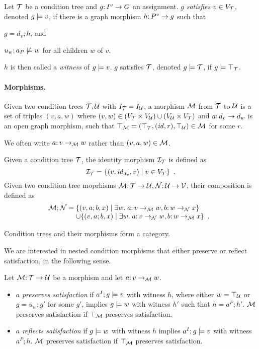 \begin{definition}[satisfaction]\label{def:satisfaction}
Let ${\mathcal{T}}$ be a condition tree and $g{:}\, I^v\rightarrow G$ an assignment. $g$ \emph{satisfies $v\in V_{\mathcal{T}}$}, denoted $g\models v$, if there is a graph morphism $h{:}\, P^v\rightarrow g$ such that
\begin{inumerate}
\item $g=d_v;h$, and 
\item $u_w;a_P\not\models w$ for all children $w$ of $v$.
\end{inumerate}
$h$ is then called a \emph{witness} of $g\models v$.
$g$ satisfies ${\mathcal{T}}$, denoted $g\models{\mathcal{T}}$, if $g\models\top_{{\mathcal{T}}}$.
\end{definition}

\paragraph{Morphisms.}

\begin{definition}
Given two condition trees ${\mathcal{T}},{\mathcal{U}}$ with $I_{\mathcal{T}}=I_{\mathcal{U}}$, a morphism ${\mathcal{M}}$ from ${\mathcal{T}}$ to ${\mathcal{U}}$ is a set of triples $(v,a,w)$ where $(v,w)\in (V_{\mathcal{T}}\times V_{\mathcal{U}})\cup (V_{\mathcal{U}}\times V_{\mathcal{T}})$ and $a{:}\, d_v\rightarrow d_w$ is an open graph morphism, such that $\top_{{\mathcal{M}}}=(\top_{{\mathcal{T}}},({\mathit{id}},r),\top_{{\mathcal{U}}})\in {\mathcal{M}}$ for some $r$.
\end{definition}
%
We often write $a{:}\, v\rightarrow_{\mathcal{M}} w$ rather than $(v,a,w)\in {\mathcal{M}}$.

Given a condition tree ${\mathcal{T}}$, the identity morphism ${\mathcal{I}}_{\mathcal{T}}$ is defined as
\[ {\mathcal{I}}_{\mathcal{T}} = \{{(v,{\mathit{id}}_{d_v},v)\mid v\in V_{\mathcal{T}}}\} \enspace. \]
Given two condition tree moprhisms ${\mathcal{M}}{:}\, {\mathcal{T}}\rightarrow {\mathcal{U}},{\mathcal{N}}{:}\, {\mathcal{U}}\rightarrow {\mathcal{V}}$, their composition is defined as
\[ \cM;\cN =
\begin{array}[t]{@{}l}
	\setof{(v,a;b,x) \mid \exists w\st a\of v\to_\cM w, b\of w\to_\cN x} \\
	\cup \setof{(v,a;b,x) \mid \exists w\st a\of v\to_\cN w, b\of w\to_\cM x} \enspace.
\end{array}
\]

\begin{proposition}
Condition trees and their morphisms form a category.
\end{proposition}

We are interested in nested condition morphisms that either preserve or reflect satisfaction, in the following sense.

\begin{definition}
Let ${\mathcal{M}}{:}\, {\mathcal{T}}\rightarrow{\mathcal{U}}$ be a morphism and let $a{:}\, v\rightarrow_{\mathcal{M}} w$.
\begin{itemize}[topsep=\smallskipamount]
\item $a$ \emph{preserves satisfaction} if $a^I;g\models v$ with witness $h$, where either $w=\top_{{\mathcal{U}}}$ or $g=u_w;g'$ for some $g'$, implies $g\models w$ with witness $h'$ such that $h=a^P;h'$. ${\mathcal{M}}$ preserves satisfaction if $\top_{{\mathcal{M}}}$ preserves satisfaction.
\item $a$ \emph{reflects satisfaction} if $g\models w$ with witness $h$ implies $a^I;g\models v$ with witness $a^P;h$. ${\mathcal{M}}$ preserves satisfaction if $\top_{{\mathcal{M}}}$ preserves satisfaction.
\end{itemize}
\end{definition}


